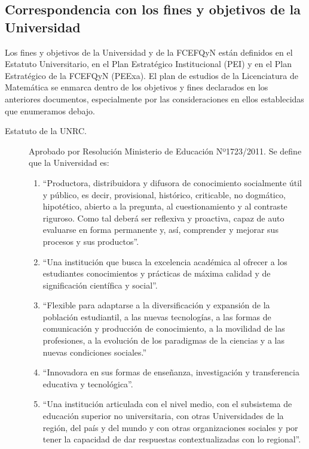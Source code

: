 \documentclass[a4paper, 12pt]{article}
\begin{document}
\subsection{Correspondencia con los fines y objetivos de la Universidad}

Los fines y objetivos de la Universidad y de la FCEFQyN están definidos en el Estatuto Universitario, en el Plan Estratégico Institucional (PEI) y en el Plan Estratégico  de la FCEFQyN (PEExa). El plan de estudios de la Licenciatura de Matemática se enmarca dentro de los objetivos y fines declarados en los anteriores documentos, especialmente por las consideraciones en ellos establecidas  que enumeramos debajo. 


\begin{description}
 \item[Estatuto de la UNRC.]   Aprobado por Resolución Ministerio de Educación Nº1723/2011.  Se define que la Universidad es:
\begin{enumerate}

\item ``Productora, distribuidora y difusora de conocimiento socialmente útil y público, es
decir, provisional, histórico, criticable, no dogmático, hipotético, abierto a la
pregunta, al cuestionamiento y al contraste riguroso. Como tal deberá ser reflexiva
y proactiva, capaz de auto evaluarse en forma permanente y, así, comprender y
mejorar sus procesos y sus productos''.


\item ``Una institución que busca la excelencia académica al ofrecer a los estudiantes
conocimientos y prácticas de máxima calidad y de significación científica y social''.

\item ``Flexible para adaptarse a la diversificación y expansión de la población estudiantil, 
a las nuevas tecnologías, a las formas de comunicación y producción de
conocimiento, a la movilidad de las profesiones, a la evolución de los paradigmas
de la ciencias y a las nuevas condiciones sociales.''

\item ``Innovadora en sus formas de enseñanza, investigación y transferencia educativa y
tecnológica''.

\item ``Una institución articulada con el nivel medio, con el subsistema de educación
superior no universitaria, con otras Universidades de la región, del país y del
mundo y con otras organizaciones sociales
 y por tener la capacidad de dar
respuestas contextualizadas con lo regional''.
\end{enumerate}


\end{description}
\end{document}
